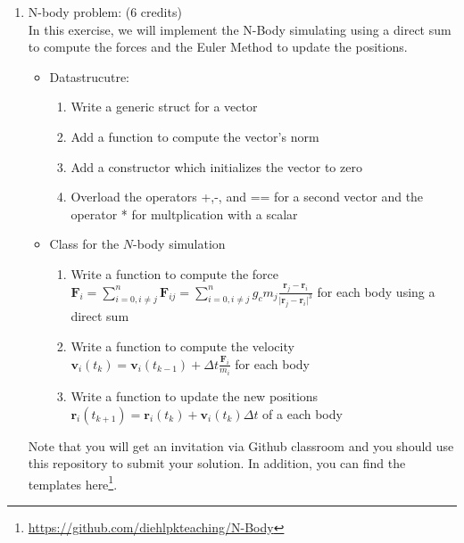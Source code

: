\documentclass[11pt]{article}
\begin{document}
\begin{enumerate}

\item N-body problem: (6 credits)\\
In this exercise, we will implement the N-Body simulating using a direct sum to compute the forces and the Euler Method to update the positions.
\begin{itemize}
\item Datastrucutre:
\begin{enumerate}
\item Write a generic struct for a vector
\item Add a function to compute the vector's norm
\item Add a constructor which initializes the vector to zero
\item Overload the operators +,-, and == for a second vector and the operator * for multplication with a scalar
\end{enumerate}
\item Class for the $N$-body simulation
\begin{enumerate}
\item Write a function to compute the force $\mathbf{F}_i=\sum\limits_{i=0,i\neq j}^n \mathbf{F}_{ij}= \sum\limits_{i=0,i\neq j}^n g_c m_j \frac{\mathbf{r}_j-\mathbf{r}_i}{\vert \mathbf{r}_j - \mathbf{r}_i\vert^3}$ for each body using a direct sum
\item Write a function to compute the velocity $\mathbf{v}_i(t_k)=\mathbf{v}_i(t_{k-1})+\Delta t \frac{\mathbf{F}_i}{m_i}$ for each body
\item Write a function to update the new positions $\mathbf{r}_i(t_{k+1})=\mathbf{r}_i(t_k)+\mathbf{v}_i(t_k)\Delta t$ of a each body
\end{enumerate}
\end{itemize}



Note that you will get an invitation via Github classroom and you should use this repository to submit your solution. In addition, you can find the templates here\footnote{\url{https://github.com/diehlpkteaching/N-Body}}.



\end{enumerate}

\doclicenseThis 
\end{document}
